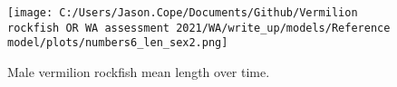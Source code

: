 \documentclass[11pt,
  english,
  a4paper,
]{article}
\begin{document}
\leavevmode\tagmcend\tagstructend


\begin{figure}
\centering
\texttt{[image: C:/Users/Jason.Cope/Documents/Github/Vermilion rockfish OR WA assessment 2021/WA/write\_up/models/Reference model/plots/numbers6\_len\_sex2.png]}
\caption{Male vermilion rockfish mean length over time.\label{fig:num_lts_males}}
\end{figure}

\tagmcend\tagstructend

\clearpage
\end{document}
